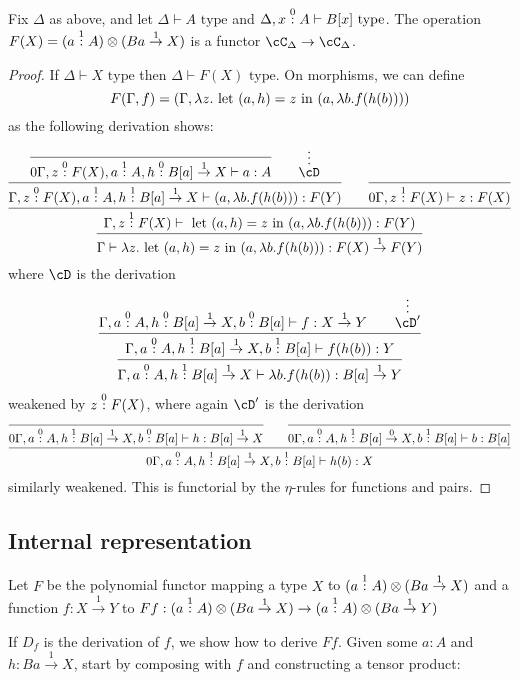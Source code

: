 \documentclass[12pt,a4paper]{article}
\begin{document}
\begin{lemma}
  Fix $\Delta$ as above, and let $\Delta \vdash A \text{ type}$ and $\Delta, x \overset{0}{:} A \vdash B[x] \text{ type}$. The operation $F(X) = (a \overset{1}{:} A) \otimes (Ba \overset{1}\to X)$ is a functor $\cC_\Delta \to \cC_\Delta$.
\end{lemma}
\begin{proof}
  If $\Delta \vdash X \text{ type}$ then $\Delta \vdash F(X) \text{ type}$. On morphisms, we can define
  \[
    F(\Gamma, f) = (\Gamma, \lambda z . \text{ let } (a, h) = z \text{ in } (a, \lambda b . f(h(b))))
  \]
  as the following derivation shows:
  \[
    \infer{\Gamma \vdash \lambda z . \letin{a, h}{z}{(a, \lambda b . f(h(b)))} : F(X) \ofto{1} F(Y)}
       {\infer{\Gamma, z \of{1} F(X) \vdash \letin{a, h}{z}{(a, \lambda b . f(h(b)))} : F(Y)}
          { \infer{\Gamma, z \of{0} F(X), a \of{1} A, h \of{1} B[a] \ofto{1} X \vdash (a, \lambda b . f(h(b))) : F(Y)}{\infer{0\Gamma, z \of{0} F(X), a \of{1} A, h \of{0} B[a] \ofto{1} X \vdash a : A}{} & \quad \deduce{\cD}{\vdots}} & \quad \infer{0\Gamma, z \of{1} F(X) \vdash z : F(X)}{}}}
      \]
      where $\cD$ is the derivation
      \[
                 {
            \infer{\Gamma, a \of{0} A, h \of{1} B[a] \ofto{1} X \vdash \lambda b . f(h(b)) : B[a] \ofto{1} Y}{ \infer{\Gamma, a \of{0} A, h \of{1} B[a] \ofto{1} X, b \of{1} B[a]  \vdash f(h(b)) : Y}{ {\Gamma, a \of{0} A, h \of{0} B[a] \ofto{1} X, b \of{0} B[a] \vdash f : X \ofto{1} Y} & \quad \deduce{\cD'}{\vdots} }} }
        \]
        weakened by $z \overset{0}{:} F(X)$, where again $\cD'$ is the derivation
        \[
\infer{0\Gamma, a \of{0} A, h \of{1} B[a] \ofto{1} X, b \of{1} B[a] \vdash h(b) : X}{\infer{0\Gamma, a \of{0} A, h \of{1} B[a] \ofto{1} X, b \of{0} B[a] \vdash h : B[a] \ofto{1} X}{} & \quad \infer{0\Gamma, a \of{0} A, h \of{1} B[a] \ofto{0} X, b \of{1} B[a] \vdash b : B[a]}{}}
\]
similarly weakened. This is functorial by the $\eta$-rules for functions and pairs.
\end{proof}


\subsection{Internal representation}
Let $F$ be the polynomial functor mapping a type $X$ to $(a \overset{1}{:} A) \otimes (Ba \overset{1}\to X)$ and a function $f : X \overset{1}\to Y$ to $Ff : (a \overset{1}{:} A)\otimes(Ba \overset{1}{\to} X) \to (a \overset{1}{:} A)\otimes(Ba \overset{1}{\to } Y)$

If $D_f$ is the derivation of $f$, we show how to derive $Ff$. Given some $a : A$ and $h : B a \overset{1}\to X$, start by composing with $f$ and constructing a tensor product:
\end{document}
